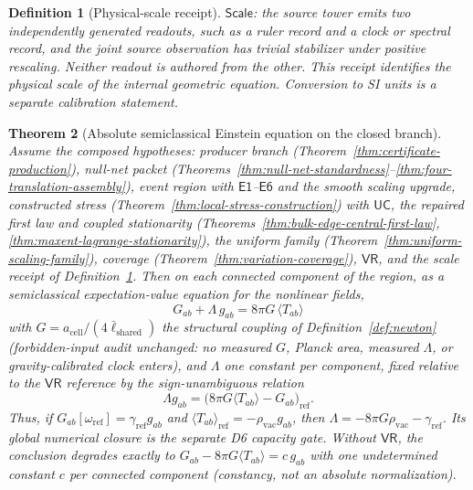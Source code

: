 \documentclass[11pt]{article}
\newtheorem{theorem}{Theorem}[section]
\newtheorem{definition}[theorem]{Definition}
\begin{document}
\begin{definition}[Physical-scale receipt]
\label{def:einstein-physical-scale-receipt}
\(\mathsf{Scale}\): the source tower emits two independently generated
readouts, such as a ruler record and a clock or spectral record, and the joint
source observation has trivial stabilizer under positive rescaling. Neither
readout is authored from the other. This receipt identifies the physical scale
of the internal geometric equation. Conversion to SI units is a separate
calibration statement.
\end{definition}

\begin{theorem}[Absolute semiclassical Einstein equation on the closed branch]
\label{thm:absolute-einstein-base-condition}
Assume the composed hypotheses: producer branch
(Theorem~\ref{thm:certificate-production}), null-net packet
(Theorems~\ref{thm:null-net-standardness}--\ref{thm:four-translation-assembly}),
event region with \(\mathsf{E1}\)--\(\mathsf{E6}\) and the smooth scaling
upgrade, constructed stress (Theorem~\ref{thm:local-stress-construction})
with \(\mathsf{UC}\), the repaired first law and coupled stationarity
(Theorems~\ref{thm:bulk-edge-central-first-law},
\ref{thm:maxent-lagrange-stationarity}), the uniform family
(Theorem~\ref{thm:uniform-scaling-family}), coverage
(Theorem~\ref{thm:variation-coverage}), \(\mathsf{VR}\), and the scale
receipt of Definition~\ref{def:einstein-physical-scale-receipt}. Then on each
connected component of the region, as a semiclassical expectation-value
equation for the nonlinear fields,
\[
\boxed{\;G_{ab}+\Lambda\,g_{ab}=8\pi G\,\langle T_{ab}\rangle\;}
\]
with \(G=a_{\mathrm{cell}}/(4\bar\ell_{\mathrm{shared}})\) the structural
coupling of Definition~\ref{def:newton} (forbidden-input audit unchanged: no
measured \(G\), Planck area, measured \(\Lambda\), or gravity-calibrated
clock enters), and \(\Lambda\) one constant per component, fixed relative to
the \(\mathsf{VR}\) reference by the sign-unambiguous relation
\[
\Lambda g_{ab}
=\bigl(8\pi G\langle T_{ab}\rangle-G_{ab}\bigr)_{\mathrm{ref}}.
\]
Thus, if \(G_{ab}[\omega_{\mathrm{ref}}]=\gamma_{\mathrm{ref}}g_{ab}\)
and \(\langle T_{ab}\rangle_{\mathrm{ref}}=-\rho_{\mathrm{vac}}g_{ab}\),
then \(\Lambda=-8\pi G\rho_{\mathrm{vac}}-\gamma_{\mathrm{ref}}\). Its global
numerical closure is the separate D6 capacity gate. Without
\(\mathsf{VR}\), the conclusion degrades exactly to
\(G_{ab}-8\pi G\langle T_{ab}\rangle=c\,g_{ab}\) with one undetermined
constant \(c\) per connected component (constancy, not an absolute
normalization).
\end{theorem}
\end{document}
